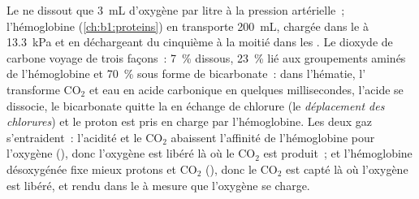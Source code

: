 \begin{proposition}\label{prop:b1:gas-exchange:transport}
Le  ne dissout que \qty{3}{mL} d'oxygène par litre à la pression
artérielle~; l'hémoglobine (\cref{ch:b1:proteins}) en transporte
\qty{200}{mL}, chargée dans le  à \qty{13.3}{kPa} et en
déchargeant du cinquième à la moitié dans les . Le dioxyde de
carbone voyage de trois façons~: \qty{7}{\%} dissous, \qty{23}{\%} lié
aux groupements aminés de l'hémoglobine et \qty{70}{\%} sous forme de
bicarbonate~: dans l'hématie, l'\emph{} transforme $\mathrm{CO_2}$ et eau en acide carbonique en
quelques millisecondes, l'acide se dissocie, le bicarbonate quitte la
 en échange de chlorure (le \emph{déplacement des chlorures}) et
le proton est pris en charge par l'hémoglobine. Les deux gaz
s'entraident~: l'acidité et le
$\mathrm{CO_2}$ abaissent l'affinité de l'hémoglobine pour l'oxygène (\emph{}), donc l'oxygène est libéré là où le $\mathrm{CO_2}$ est produit~; et
l'hémoglobine désoxygénée fixe mieux protons et $\mathrm{CO_2}$
(\emph{}), donc le $\mathrm{CO_2}$ est capté là où l'oxygène
est libéré, et rendu dans le  à mesure que l'oxygène se charge.
\end{proposition}

